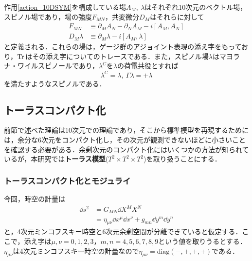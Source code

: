 \documentclass[a4paper,uplatex,dvipdfmx]{jsarticle}
\theoremstyle{definition}
\begin{document}
作用\eqref{action_10DSYM}を構成している場$A_{M},\ \lambda$はそれぞれ10次元のベクトル場，スピノル場であり，場の強度$F_{MN}$，共変微分$D_{M}$はそれらに対して
\begin{align}
   F_{MN}
   &\equiv
   \partial_{M}A_{N}
   -
   \partial_{N}A_{M}
   -
   i[A_{M},A_{N}]
   \nonumber
   \\
   D_{M}\lambda
   &\equiv
   \partial_{M}\lambda
   -
   i[A_{M},\lambda]
   \nonumber
\end{align}
と定義される．これらの場は，ゲージ群のアジョイント表現の添え字をもっており，$\text{Tr\hspace{1pt}}$はその添え字についてのトレースである．また，スピノル場$\lambda$はマヨラナ・ワイルスピノールであり，$\lambda^{C}$を$\lambda$の荷電共役とすれば
\begin{equation}
   \lambda^{C}
   =
   \lambda
   ,\ 
   \Gamma\lambda
   =
   +\lambda
   \nonumber
\end{equation}
を満たすようなスピノルである．


\subsection{トーラスコンパクト化}

前節で述べた理論は10次元での理論であり，そこから標準模型を再現するためには，余分な6次元をコンパクト化し，その次元が観測できないほどに小さいことを確認する必要がある．余剰次元のコンパクト化にはいくつかの方法が知られているが，本研究では\textbf{トーラス模型}($T^{2}\times T^{2}\times T^{2}$)を取り扱うことにする．

\subsubsection{トーラスコンパクト化とモジュライ}

今回，時空の計量は
\begin{align}
   \dd s^2
   &=
   G_{MN}\dd X^{M}X^{N}
   \nonumber
   \\
   &=
   \eta_{\mu\nu}\dd x^{\mu}\dd x^{\nu}
   +
   g_{mn}\dd y^{m}\dd y^{n}
   \nonumber
\end{align}
と，4次元ミンコフスキー時空と6次元余剰空間が分離できていると仮定する．ここで，添え字は$\mu,\nu=0,1,2,3$，$m,n=4,5,6,7,8,9$という値を取りうるとする．$\eta_{\mu\nu}$は4次元ミンコフスキー時空の計量なので$\eta_{\mu\nu}=\text{diag}(-,+,+,+)$である．
\end{document}
